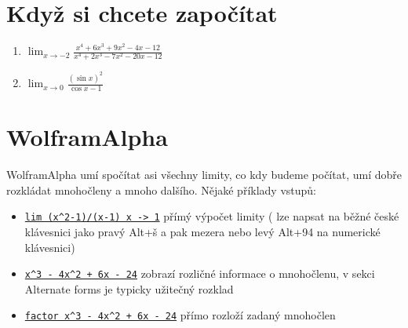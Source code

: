 \documentclass[12pt,a4paper]{article}
\begin{document}
\section{Když si chcete započítat}

\begin{enumerate}
	\everymath{\displaystyle}
	\parskip\bigskipamount
	\item $\lim_{x \to -2} \frac{x^4+6 x^3+9 x^2-4 x-12}{x^4+2 x^3-7 x^2-20 x-12}$
	\item $\lim_{x \to 0}\frac{(\sin x)^2}{\cos x - 1}$
\end{enumerate}

\section{WolframAlpha}

WolframAlpha umí spočítat asi všechny limity, co kdy budeme počítat, umí dobře rozkládat mnohočleny a mnoho dalšího. Nějaké příklady vstupů:
\begin{itemize}
	\item \href{https://www.wolframalpha.com/input/?i=lim+\%28x\%5E2-1\%29\%2F\%28x-1\%29+x+-\%3E+1}{\texttt{lim (x\^{}2-1)/(x-1) x -> 1}} přímý výpočet limity ( lze napsat na běžné české klávesnici jako pravý Alt+š a pak mezera nebo levý Alt+94 na numerické klávesnici)
	\item \href{https://www.wolframalpha.com/input/?i=x\%5E3+-+4x\%5E2+\%2B+6x+-+24}{\texttt{x\^{}3 - 4x\^{}2 + 6x - 24}} zobrazí rozličné informace o mnohočlenu, v sekci Alternate forms je typicky užitečný rozklad
	\item \href{https://www.wolframalpha.com/input/?i=factor+x\%5E3+-+4x\%5E2+\%2B+6x+-+24}{\texttt{factor x\^{}3 - 4x\^{}2 + 6x - 24}} přímo rozloží zadaný mnohočlen
\end{itemize}
\end{document}
